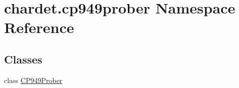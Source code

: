\hypertarget{namespacechardet_1_1cp949prober}{}\section{chardet.\+cp949prober Namespace Reference}
\label{namespacechardet_1_1cp949prober}
\subsection*{Classes}
\begin{DoxyCompactItemize}
\item 
class \hyperlink{classchardet_1_1cp949prober_1_1_c_p949_prober}{C\+P949\+Prober}
\end{DoxyCompactItemize}
